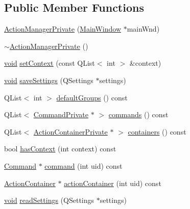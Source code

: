\subsection*{\-Public \-Member \-Functions}
\begin{DoxyCompactItemize}
\item 
\hyperlink{group___core_plugin_ga12aef0a3b78b0e37f3db4a05e4e89615}{\-Action\-Manager\-Private} (\hyperlink{class_core_1_1_internal_1_1_main_window}{\-Main\-Window} $\ast$main\-Wnd)
\item 
\hyperlink{group___core_plugin_ga05b7f5a2c3f9b034d08ac45e5096a854}{$\sim$\-Action\-Manager\-Private} ()
\item 
\hyperlink{group___u_a_v_objects_plugin_ga444cf2ff3f0ecbe028adce838d373f5c}{void} \hyperlink{group___core_plugin_gaf1c3a6da903b910e7bf3b042d75f4f6d}{set\-Context} (const \-Q\-List$<$ int $>$ \&context)
\item 
\hyperlink{group___u_a_v_objects_plugin_ga444cf2ff3f0ecbe028adce838d373f5c}{void} \hyperlink{group___core_plugin_ga14b0ae1450cbbeb3a20d57f42414cb40}{save\-Settings} (\-Q\-Settings $\ast$settings)
\item 
\-Q\-List$<$ int $>$ \hyperlink{group___core_plugin_ga83364e44abe77408ac169e851f7d998f}{default\-Groups} () const 
\item 
\-Q\-List$<$ \hyperlink{class_core_1_1_internal_1_1_command_private}{\-Command\-Private} $\ast$ $>$ \hyperlink{group___core_plugin_ga91b9907f02df212989f82a7af1d544e9}{commands} () const 
\item 
\-Q\-List$<$ \hyperlink{class_core_1_1_internal_1_1_action_container_private}{\-Action\-Container\-Private} $\ast$ $>$ \hyperlink{group___core_plugin_ga984362f3bdf006ac121c1e3e7a10f49e}{containers} () const 
\item 
bool \hyperlink{group___core_plugin_ga6b861e343876351edf5d2fae24a5f0cb}{has\-Context} (int context) const 
\item 
\hyperlink{class_core_1_1_command}{\-Command} $\ast$ \hyperlink{group___core_plugin_ga5a55bb1c0b2a8c78afc2ba6dbaf2427d}{command} (int uid) const 
\item 
\hyperlink{class_core_1_1_action_container}{\-Action\-Container} $\ast$ \hyperlink{group___core_plugin_ga3ec130bab28be18162ff49816e062c07}{action\-Container} (int uid) const 
\item 
\hyperlink{group___u_a_v_objects_plugin_ga444cf2ff3f0ecbe028adce838d373f5c}{void} \hyperlink{group___core_plugin_ga097c433a1e3ae316de47ded726e0f639}{read\-Settings} (\-Q\-Settings $\ast$settings)

\end{DoxyCompactItemize}
